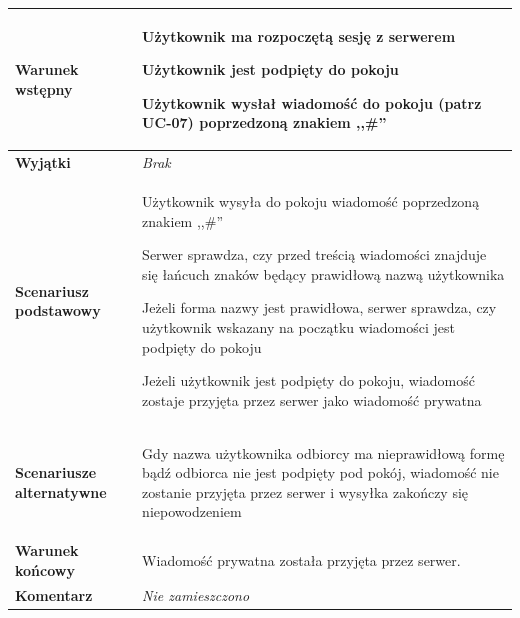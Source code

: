 {\begin{tabular}{ | l | l | }
	\hline
		\parbox[t]{4cm}{\textbf{Warunek wstępny}} & \parbox[t]{11cm}{
			\begin{enumreq}
				\item Użytkownik ma rozpoczętą sesję z serwerem
				\item Użytkownik jest podpięty do pokoju
				\item Użytkownik wysłał wiadomość do pokoju (patrz UC-07)
				poprzedzoną znakiem ,,\#''
			\end{enumreq}
				
		}
		\\
		
	\hline
		\parbox[t]{4cm}{\textbf{Wyjątki}} & \parbox[t]{11cm}{
			\textit{Brak}
			
		}
		\\

	\hline
		\parbox[t]{4cm}{\textbf{Scenariusz podstawowy}} & \parbox[t]{11cm}{
			\begin{enumreq}
				\item Użytkownik wysyła do pokoju wiadomość poprzedzoną
				znakiem ,,\#''
				\item Serwer sprawdza, czy przed treścią wiadomości znajduje
				się łańcuch znaków będący prawidłową nazwą użytkownika
				\item Jeżeli forma nazwy jest prawidłowa, serwer sprawdza,
				czy użytkownik wskazany na początku wiadomości jest podpięty
				do pokoju
				\item Jeżeli użytkownik jest podpięty do pokoju, wiadomość
				zostaje przyjęta przez serwer jako wiadomość prywatna
			\end{enumreq}
		}
		\\
		
	\hline
		\parbox[t]{4cm}{\textbf{Scenariusze alternatywne}} & \parbox[t]
		{11cm}{
			\begin{enumreq}
				\item Gdy nazwa użytkownika odbiorcy ma nieprawidłową formę
				bądź odbiorca nie jest podpięty pod pokój, wiadomość nie
				zostanie przyjęta przez serwer i wysyłka zakończy się
				niepowodzeniem
			\end{enumreq}
		}
		\\
		
	\hline
		\parbox[t]{4cm}{\textbf{Warunek końcowy}} & \parbox[t]{11cm}{
			Wiadomość prywatna została przyjęta przez serwer.
		}
		\\
		
	\hline
		\parbox[t]{4cm}{\textbf{Komentarz}} & \parbox[t]{11cm}{
			\textit{Nie zamieszczono}
		}
		\\


\end{tabular}}
